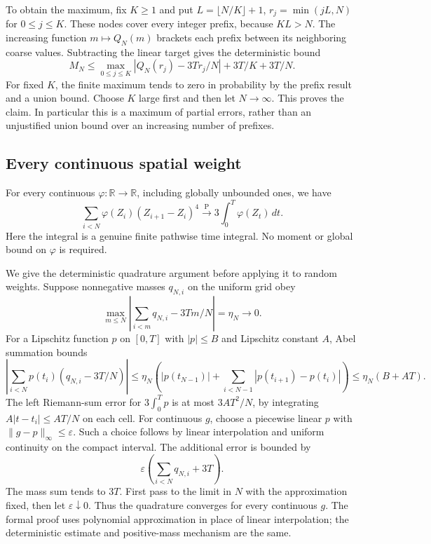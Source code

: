 \documentclass[11pt]{article}
\theoremstyle{remark}\newtheorem{remark}[theorem]{Remark}
\newcommand{\R}{\mathbb R}\newcommand{\Pconv}{\xrightarrow{\mathrm P}}
\begin{document}
To obtain the maximum, fix $K\geq1$ and put
$L=\lfloor N/K\rfloor+1$, $r_j=\min(jL,N)$ for $0\leq j\leq K$.
These nodes cover every integer prefix, because $KL>N$.
The increasing function $m\mapsto Q_N(m)$ brackets each prefix
between its neighboring coarse values. Subtracting the linear
target gives the deterministic bound
\[
 M_N\leq\max_{0\leq j\leq K}|Q_N(r_j)-3Tr_j/N|
               +3T/K+3T/N.
\]
For fixed $K$, the finite maximum tends to zero in probability by
the prefix result and a union bound. Choose $K$ large first and
then let $N\to\infty$. This proves the claim. In particular this
is a maximum of partial errors, rather than an unjustified union
bound over an increasing number of prefixes.

\subsection*{Every continuous spatial weight}
For every continuous $\varphi:\R\to\R$, including globally
unbounded ones, we have
\begin{equation}\label{eq:weightedquartic}
 \sum_{i<N}\varphi(Z_i)(Z_{i+1}-Z_i)^4
       \Pconv3\int_0^T\varphi(Z_t)\,dt.
\end{equation}
Here the integral is a genuine finite pathwise time integral.
No moment or global bound on $\varphi$ is required.

We give the deterministic quadrature argument before applying it
to random weights. Suppose nonnegative masses $q_{N,i}$ on the
uniform grid obey
\[
 \max_{m\leq N}\left|\sum_{i<m}q_{N,i}-3Tm/N\right|
       =\eta_N\longrightarrow0.
\]
For a Lipschitz function $p$ on $[0,T]$ with
$|p|\leq B$ and Lipschitz constant $A$, Abel summation bounds
\[
 \left|\sum_{i<N}p(t_i)(q_{N,i}-3T/N)\right|
 \leq\eta_N\left(|p(t_{N-1})|
             +\sum_{i<N-1}|p(t_{i+1})-p(t_i)|\right)
 \leq\eta_N(B+AT).
\]
The left Riemann-sum error for $3\int_0^Tp$ is at most
$3AT^2/N$, by integrating $A|t-t_i|\leq AT/N$ on each cell.
For continuous $g$, choose a piecewise linear $p$ with
$\|g-p\|_\infty\leq\varepsilon$. Such a choice follows by linear
interpolation and uniform continuity on the compact interval.
The additional error is bounded by
\[
 \varepsilon\left(\sum_{i<N}q_{N,i}+3T\right).
\]
The mass sum tends to $3T$. First pass to the limit in $N$ with
the approximation fixed, then let $\varepsilon\downarrow0$.
Thus the quadrature converges for every continuous $g$.
The formal proof uses polynomial approximation in place of linear
interpolation; the deterministic estimate and positive-mass
mechanism are the same.
\end{document}
